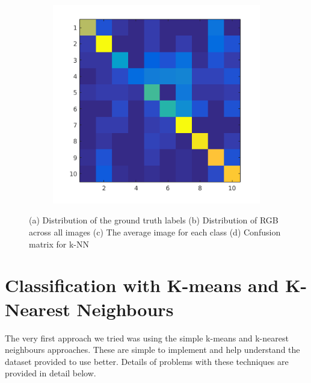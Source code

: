 \documentclass{article} %
\begin{document}
\begin{figure}
\begin{subfigure}{.2\linewidth}
        \caption{}
        \end{subfigure}
        \begin{subfigure}{.2\linewidth}
            \centering
            \includegraphics[width=.75\linewidth]{images/knn-confusion.png}
            \caption{}
        \end{subfigure}
        \caption{(a) Distribution of the ground truth labels (b) Distribution of RGB across all images (c) The average image for each class (d) Confusion matrix for k-NN}
    \end{figure}
    
    
    

\section{Classification with K-means and K-Nearest Neighbours}
    The very first approach we tried was using the simple k-means and k-nearest neighbours approaches. These are simple to implement and help understand the dataset provided to use better. Details of problems with these techniques are provided in detail below.
\end{document}
